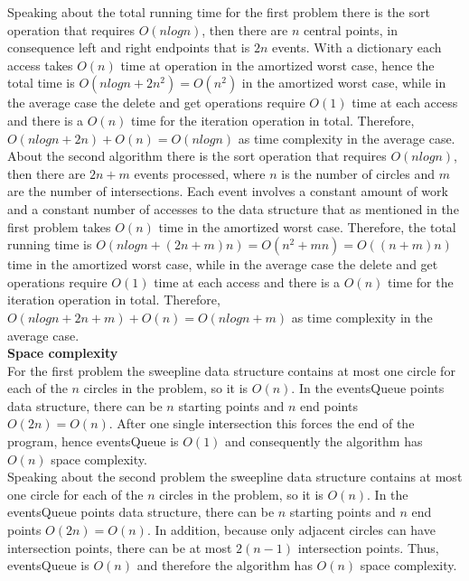 \documentclass[12pt]{article}
\begin{document}
\noindent Speaking about the total running time for the first problem there is the sort operation that requires $O(nlogn)$, then there are $n$ central points, in consequence left and right endpoints that is $2n$ events. With a dictionary each access takes $O(n)$ time at operation in the amortized worst case, hence the total time is $O(nlogn + 2n^2) = O(n^2)$ in the amortized worst case, while in the average case the delete and get operations require $O(1)$ time at each access and there is a $O(n)$ time for the iteration operation in total. Therefore, $O(nlogn + 2n)+O(n) = O(nlogn)$ as time complexity in the average case. \\

\noindent About the second algorithm there is the sort operation that requires $O(nlogn)$, then there are $2n + m$ events processed, where $n$ is the number of circles and $m$ are the number of intersections. Each event involves a constant amount of work and a constant number of accesses to the data structure that as mentioned in the first problem takes $O(n)$ time in the amortized worst case. Therefore, the total running time is $O(nlogn + (2n + m) n) = O(n^2 + mn) = O((n + m)n)$ time in the amortized worst case, while in the average case the delete and get operations require $O(1)$ time at each access and there is a $O(n)$ time for the iteration operation in total. Therefore, $O(nlogn + 2n+m)+O(n) = O(nlogn+m)$ as time complexity in the average case. \\

\noindent \textbf{Space complexity}\\
For the first problem the sweepline data structure contains at most one circle for each of the $n$ circles in the problem, so it is $O(n)$. In the eventsQueue points data structure, there can be $n$ starting points and $n$ end points $O(2n) = O(n)$. After one single intersection this forces the end of the program, hence eventsQueue is $O(1)$ and consequently the algorithm has $O(n)$ space complexity. \\

\noindent Speaking about the second problem the sweepline data structure contains at most one circle for each of the $n$ circles in the problem, so it is $O(n)$. In the eventsQueue points data structure, there can be $n$ starting points and $n$ end points $O(2n) = O(n)$. In addition, because only adjacent circles can have intersection points, there can be at most $2(n - 1)$ intersection points. Thus, eventsQueue is $O(n)$ and therefore the algorithm has $O(n)$ space complexity. \\
\end{document}
